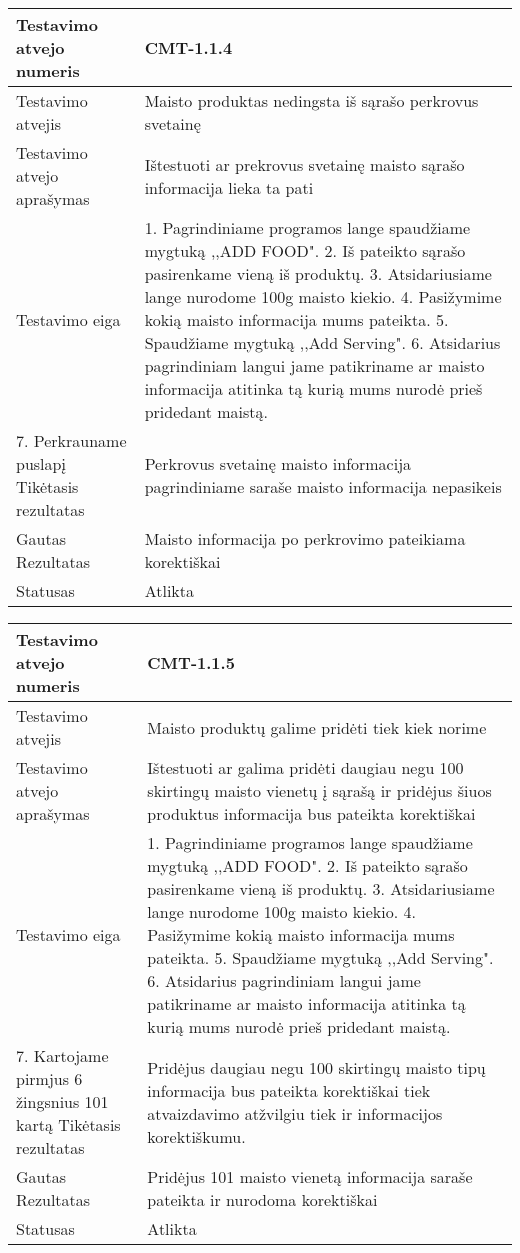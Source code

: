 \documentclass[oneside]{VUMIFPSkursinis}
\begin{document}
\begin{center}
    \begin{tabular}{ |p{5cm}|p{13cm}|}
    \hline
        Testavimo atvejo numeris & CMT-1.1.4  \\ \hline
        Testavimo atvejis & Maisto produktas nedingsta iš sąrašo perkrovus svetainę  \\ \hline
        Testavimo atvejo aprašymas & Ištestuoti ar prekrovus svetainę maisto sąrašo informacija lieka ta pati  \\ \hline
        Testavimo eiga &  1. Pagrindiniame programos lange spaudžiame mygtuką ,,ADD FOOD". 
				2. Iš pateikto sąrašo pasirenkame vieną iš produktų. 
				3. Atsidariusiame lange nurodome 100g maisto kiekio.
				4. Pasižymime kokią maisto informacija mums pateikta. 
				5. Spaudžiame mygtuką ,,Add Serving".
				6. Atsidarius pagrindiniam langui jame patikriname ar maisto informacija atitinka tą kurią mums nurodė prieš pridedant maistą.\\ \hline
				7. Perkrauname puslapį
        Tikėtasis rezultatas &  Perkrovus svetainę maisto informacija pagrindiniame saraše maisto informacija nepasikeis\\ \hline
        Gautas Rezultatas & Maisto informacija po perkrovimo pateikiama korektiškai  \\ \hline
        Statusas & Atlikta  \\ \hline
    \hline
    \end{tabular}
\end{center}

\begin{center}
    \begin{tabular}{ |p{5cm}|p{13cm}|}
    \hline
        Testavimo atvejo numeris & CMT-1.1.5  \\ \hline
        Testavimo atvejis & Maisto produktų galime pridėti tiek kiek norime  \\ \hline
        Testavimo atvejo aprašymas & Ištestuoti ar galima pridėti daugiau negu 100 skirtingų maisto vienetų į sąrašą ir pridėjus šiuos produktus informacija bus pateikta korektiškai \\ \hline
        Testavimo eiga &  1. Pagrindiniame programos lange spaudžiame mygtuką ,,ADD FOOD". 
				2. Iš pateikto sąrašo pasirenkame vieną iš produktų. 
				3. Atsidariusiame lange nurodome 100g maisto kiekio.
				4. Pasižymime kokią maisto informacija mums pateikta. 
				5. Spaudžiame mygtuką ,,Add Serving".
				6. Atsidarius pagrindiniam langui jame patikriname ar maisto informacija atitinka tą kurią mums nurodė prieš pridedant maistą.\\ \hline
				7. Kartojame pirmjus 6 žingsnius 101 kartą
        Tikėtasis rezultatas & Pridėjus daugiau negu 100 skirtingų maisto tipų informacija bus pateikta korektiškai tiek atvaizdavimo atžvilgiu tiek ir informacijos korektiškumu.\\ \hline
        Gautas Rezultatas & Pridėjus 101 maisto vienetą informacija saraše pateikta ir nurodoma korektiškai  \\ \hline
        Statusas & Atlikta  \\ \hline
    \hline
    \end{tabular}
\end{center}
\end{document}
